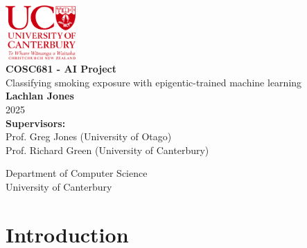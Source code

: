 \documentclass{article}
\begin{document}
\doublespacing


\begin{titlepage}
    \centering
    \singlespacing
    \vspace*{1cm}

    \includegraphics[width=0.2\textwidth]{University_of_Canterbury_logo.svg.png}\\[1.5cm]

    \Huge
    \textbf{COSC681 - AI Project}\\[1.5cm]

    \LARGE
    Classifying smoking exposure with epigentic-trained machine learning\\[2cm]

    \Large
    \textbf{Lachlan Jones}\\[0.5cm]
    2025\\[1cm]

    \large
    \textbf{Supervisors:}\\
    Prof. Greg Jones (University of Otago)\\
    Prof. Richard Green (University of Canterbury)

    \vfill

    \Large
    Department of Computer Science\\
    University of Canterbury
\end{titlepage}


\begin{abstract}

\end{abstract}

\newpage
\tableofcontents

\listoffigures

\listoftables

\newpage
{}

\section{Introduction}
\end{document}

